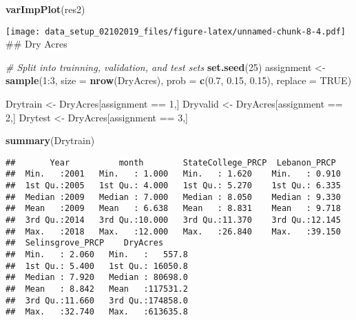 \documentclass[]{article}
\newenvironment{Shaded}{\begin{snugshade}}{\end{snugshade}}
\newcommand{\KeywordTok}[1]{\textcolor[rgb]{0.13,0.29,0.53}{\textbf{{#1}}}}
\newcommand{\DataTypeTok}[1]{\textcolor[rgb]{0.13,0.29,0.53}{{#1}}}
\newcommand{\DecValTok}[1]{\textcolor[rgb]{0.00,0.00,0.81}{{#1}}}
\newcommand{\FloatTok}[1]{\textcolor[rgb]{0.00,0.00,0.81}{{#1}}}
\newcommand{\StringTok}[1]{\textcolor[rgb]{0.31,0.60,0.02}{{#1}}}
\newcommand{\CommentTok}[1]{\textcolor[rgb]{0.56,0.35,0.01}{\textit{{#1}}}}
\newcommand{\OtherTok}[1]{\textcolor[rgb]{0.56,0.35,0.01}{{#1}}}
\newcommand{\NormalTok}[1]{{#1}}
\begin{document}
\begin{Shaded}
\begin{Highlighting}[]
\KeywordTok{varImpPlot}\NormalTok{(res2)                      }
\end{Highlighting}
\end{Shaded}

\texttt{[image: data\_setup\_02102019\_files/figure-latex/unnamed-chunk-8-4.pdf]}
\#\# Dry Acres

\begin{Shaded}
\begin{Highlighting}[]
\CommentTok{# Split into trainning, validation, and test sets}
\KeywordTok{set.seed}\NormalTok{(}\DecValTok{25}\NormalTok{)}
\NormalTok{assignment <-}\StringTok{ }\KeywordTok{sample}\NormalTok{(}\DecValTok{1}\NormalTok{:}\DecValTok{3}\NormalTok{, }\DataTypeTok{size =} \KeywordTok{nrow}\NormalTok{(DryAcres), }\DataTypeTok{prob =} \KeywordTok{c}\NormalTok{(}\FloatTok{0.7}\NormalTok{, }\FloatTok{0.15}\NormalTok{, }\FloatTok{0.15}\NormalTok{), }\DataTypeTok{replace =} \OtherTok{TRUE}\NormalTok{)}

\NormalTok{Drytrain <-}\StringTok{ }\NormalTok{DryAcres[assignment ==}\StringTok{ }\DecValTok{1}\NormalTok{,]}
\NormalTok{Dryvalid <-}\StringTok{ }\NormalTok{DryAcres[assignment ==}\StringTok{ }\DecValTok{2}\NormalTok{,]}
\NormalTok{Drytest <-}\StringTok{ }\NormalTok{DryAcres[assignment ==}\StringTok{ }\DecValTok{3}\NormalTok{,]}

\KeywordTok{summary}\NormalTok{(Drytrain)}
\end{Highlighting}
\end{Shaded}

\begin{verbatim}
##       Year          month        StateCollege_PRCP  Lebanon_PRCP   
##  Min.   :2001   Min.   : 1.000   Min.   : 1.620    Min.   : 0.910  
##  1st Qu.:2005   1st Qu.: 4.000   1st Qu.: 5.270    1st Qu.: 6.335  
##  Median :2009   Median : 7.000   Median : 8.050    Median : 9.330  
##  Mean   :2009   Mean   : 6.638   Mean   : 8.831    Mean   : 9.718  
##  3rd Qu.:2014   3rd Qu.:10.000   3rd Qu.:11.370    3rd Qu.:12.145  
##  Max.   :2018   Max.   :12.000   Max.   :26.840    Max.   :39.150  
##  Selinsgrove_PRCP    DryAcres       
##  Min.   : 2.060   Min.   :   557.8  
##  1st Qu.: 5.400   1st Qu.: 16050.8  
##  Median : 7.920   Median : 80698.0  
##  Mean   : 8.842   Mean   :117531.2  
##  3rd Qu.:11.660   3rd Qu.:174858.0  
##  Max.   :32.740   Max.   :613635.8
\end{verbatim}
\end{document}
